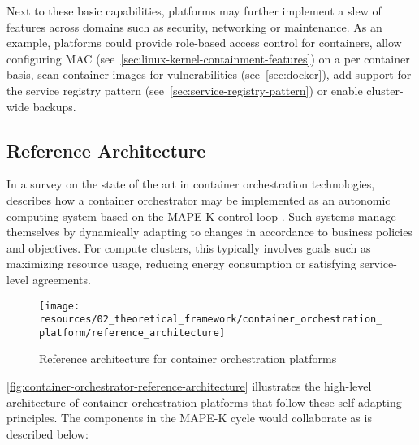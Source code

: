 Next to these basic capabilities, platforms may further implement a slew of features across domains such as security, networking or maintenance. As an example, platforms could provide role-based access control for containers, allow configuring \acs{MAC} (see~\autoref{sec:linux-kernel-containment-features}) on a per container basis, scan container images for vulnerabilities (see~\autoref{sec:docker}), add support for the service registry pattern (see~\autoref{sec:service-registry-pattern}) or enable cluster-wide backups.


\subsection{Reference Architecture}
\label{sec:orchestration-reference-architecture}

In a survey on the state of the art in container orchestration technologies, \citeauthor{casalicchio2019container} describes how a container orchestrator may be implemented as an autonomic computing system based on the \acs{MAPE-K} control loop \cite[pp.~226-228]{casalicchio2019container}. Such systems manage themselves by dynamically adapting to changes in accordance to business policies and objectives. For compute clusters, this typically involves goals such as maximizing resource usage, reducing energy consumption or satisfying service-level agreements.

\begin{figure}[hbt]
  \centering
  \texttt{[image: resources/02\_theoretical\_framework/container\_orchestration\_platform/reference\_architecture]}
  \caption[Reference architecture for container orchestration platforms]{Reference architecture for container orchestration platforms \cite[p.~226]{casalicchio2019container}}
  \label{fig:container-orchestrator-reference-architecture}
\end{figure}

\FloatBarrier

\autoref{fig:container-orchestrator-reference-architecture} illustrates the high-level architecture of container orchestration platforms that follow these self-adapting principles. The components in the \acs{MAPE-K} cycle would collaborate as is described below:

